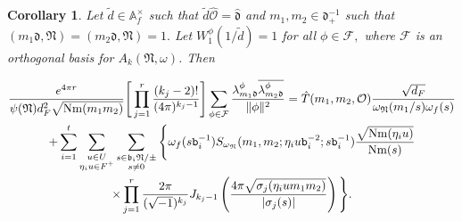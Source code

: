 \documentclass[reqno]{amsart}
\theoremstyle{plain}
\newtheorem{corollary}[theorem]{Corollary}
\theoremstyle{definition}
\theoremstyle{remark}
\def\Nr{\mathrm{Nm}}
\def\A{\mathbbm A}
\def\b{\mathtt b}
\def\A{\mathbb A}
\begin{document}
    \begin{corollary}\label{sec 2 corollary}
Let $\tilde{d}\in \A^\times_{f}$ such that $\tilde{d} \hat{\mathcal{O}}=\hat{\mathfrak{d}} $ and   $m_1,m_2\in \mathfrak{d}_+^{-1}$ such that $(m_1\mathfrak{d},\mathfrak{N} )=(m_2\mathfrak{d},\mathfrak{N})=1.$ Let     $W_1^\phi(1/\tilde{d})=1$ for all $\phi\in \mathcal{F},$ where 
 $\mathcal{F}$ is an orthogonal basis for $A_{k}(\mathfrak{N},\omega)$.  
Then 

\begin{multline*} 
\frac{e^{4\pi r}}{\psi(\mathfrak{N})d_F^2\sqrt{\Nr(m_1m_2)}}\Bigg[\prod_{j=1}^r  \frac{(k_j-2)!}{(4\pi)^{k_j-1} }\Bigg]
\sum_{{\phi}\in \mathcal{F} }\frac{\lambda^\phi_{m_1\mathfrak{d}} \overline{\lambda^\phi_{m_2\mathfrak{d}} }}{\| \phi \|^2}
=  \Hat{T}(m_1,m_2,\mathcal{O})\frac{\sqrt{d_F}}{\omega_\mathfrak{N}(m_1/s)\omega_{f}(s)} \\
+ \sum_{i=1}^t\sum_{\substack{u\in U \\ \eta_i u\in F^+}} \sum_{\substack{s\in \mathfrak{b_i}\mathfrak{N}/\pm \\ s\neq 0} } \Bigg\{ \omega_{f}(s\b_i^{-1} ) S_{\omega_\mathfrak{N}} (m_1,m_2;\eta_i u \b_i^{-2};s\b_i^{-1})
 \frac{\sqrt{\Nr(\eta_i u)}}{\Nr(s)}  \\
 \times \prod_{j=1}^r\frac{2\pi}{(\sqrt{-1})^{k_j}}J_{k_j-1} \left(  \frac{4 \pi\sqrt{\sigma_j (\eta_i u m_1m_2 )}}{|\sigma_j(s)|} \right) \Bigg\}.
\end{multline*}
    \end{corollary}
    
\end{document}

